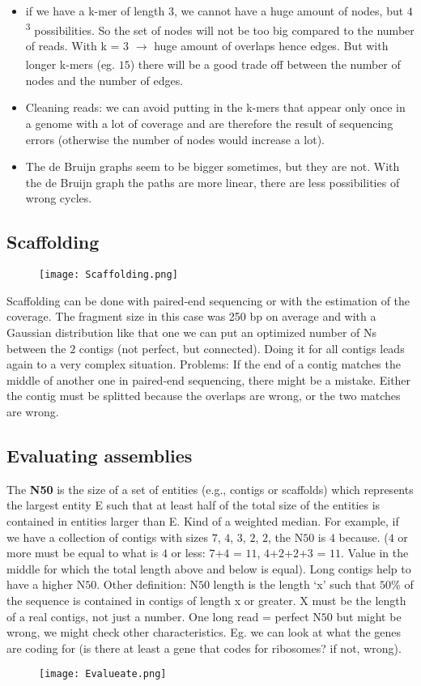 \begin{itemize}
    \item if we have a k-mer of length $3$, we cannot have a huge amount of nodes, but $4$\textsuperscript{3} possibilities. So the set of nodes will not be too big compared to the number of reads. With k = $3$ $\xrightarrow[]{}$ huge amount of overlaps hence edges. But with longer k-mers (eg. $15$) there will be a good trade off between the number of nodes and the number of edges.
    \item Cleaning reads: we can avoid putting in the k-mers that appear only once in a genome with a lot of coverage and are therefore the result of sequencing errors (otherwise the number of nodes would increase a lot).
    \item The de Bruijn graphs seem to be bigger sometimes, but they are not. With the de Bruijn graph the paths are more linear, there are less possibilities of wrong cycles. 
\end{itemize}

\subsection{Scaffolding}

\begin{figure}[h]
\centering
\texttt{[image: Scaffolding.png]}
\caption{}
\end{figure}

Scaffolding can be done with paired-end sequencing or with the estimation of the coverage. 
The fragment size in this case was 250 bp on average and with a Gaussian distribution like that one we can put an optimized number of Ns between the $2$ contigs (not perfect, but connected). 
Doing it for all contigs leads again to a very complex situation.
Problems: If the end of a contig matches the middle of another one in paired-end sequencing, there might be a mistake. Either the contig must be splitted because the overlaps are wrong, or the two matches are wrong.

\subsection{Evaluating assemblies}

The \textbf{N50} is the size of a set of entities (e.g., contigs or scaffolds) which represents the largest entity E such that at least half of the total size of the entities is contained in entities larger than E.
Kind of a weighted median. For example, if we have a collection of contigs with sizes $7$, $4$, $3$, $2$, $2$, the N$50$ is $4$ because. 
($4$ or more must be equal to what is $4$ or less: $7$+$4$ = $11$, $4$+$2$+$2$+$3$ = $11$. Value in the middle for which the total length above and below is equal).
Long contigs help to have a higher N$50$. 
Other definition: N$50$ length is the length ‘x’ such that $50$\% of the sequence is contained in contigs of length x or greater. X must be the length of a real contigs, not just a number.
One long read = perfect N$50$ but might be wrong, we might check other characteristics. Eg. we can look at what the genes are coding for (is there at least a gene that codes for ribosomes? if not, wrong).

\begin{figure}[h]
\centering
\texttt{[image: Evalueate.png]}
\caption{}
\end{figure}
